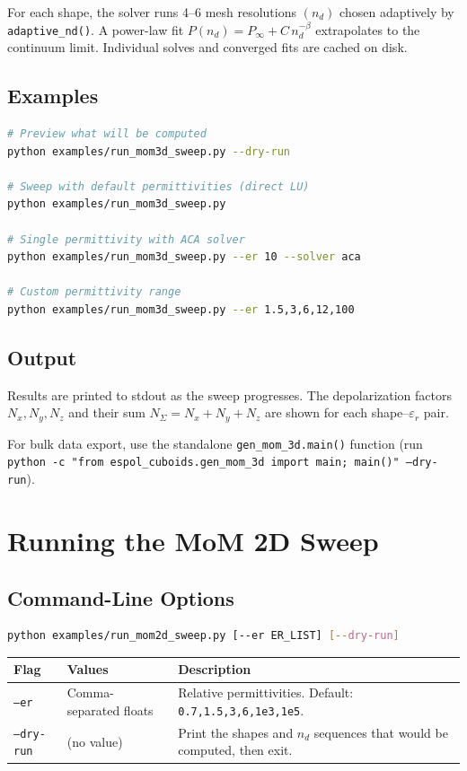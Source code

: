 \documentclass[a4paper,11pt]{article}
\begin{document}
For each shape, the solver runs 4--6 mesh resolutions $(n_d)$ chosen
adaptively by \texttt{adaptive\_nd()}.  A power-law fit
$P(n_d) = P_\infty + C\, n_d^{-\beta}$ extrapolates to the continuum
limit.  Individual solves and converged fits are cached on disk.

\subsection{Examples}

\begin{lstlisting}[language=bash]
# Preview what will be computed
python examples/run_mom3d_sweep.py --dry-run

# Sweep with default permittivities (direct LU)
python examples/run_mom3d_sweep.py

# Single permittivity with ACA solver
python examples/run_mom3d_sweep.py --er 10 --solver aca

# Custom permittivity range
python examples/run_mom3d_sweep.py --er 1.5,3,6,12,100
\end{lstlisting}

\subsection{Output}

Results are printed to stdout as the sweep progresses.  The depolarization
factors $N_x, N_y, N_z$ and their sum $N_{\Sigma} = N_x + N_y + N_z$ are
shown for each shape--$\varepsilon_r$ pair.

For bulk data export, use the standalone \texttt{gen\_mom\_3d.main()}
function (run \texttt{python -c "from espol\_cuboids.gen\_mom\_3d import main; main()" --dry-run}).

\section{Running the MoM 2D Sweep}

\subsection{Command-Line Options}

\begin{lstlisting}[language=bash]
python examples/run_mom2d_sweep.py [--er ER_LIST] [--dry-run]
\end{lstlisting}

\begin{center}
\begin{tabular}{@{}llp{6cm}@{}}
\toprule
Flag & Values & Description \\
\midrule
\texttt{--er} & Comma-separated floats
    & Relative permittivities.  Default: \texttt{0.7,1.5,3,6,1e3,1e5}. \\
\texttt{--dry-run} & (no value)
    & Print the shapes and $n_d$ sequences that would be computed, then exit. \\
\bottomrule
\end{tabular}
\end{center}
\end{document}
